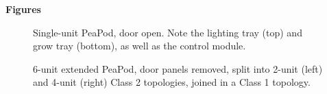 \clearpage

\textbf{Figures}

\begin{figure}[h!]
    \centering
    \caption{Single-unit PeaPod, door open. Note the lighting tray (top) and grow tray (bottom), as well as the control module.}
    \label{fig:housing_single}
\end{figure}

\begin{figure}[h!]
    \centering
    \caption{6-unit extended PeaPod, door panels removed, split into 2-unit (left) and 4-unit (right) Class 2 topologies, joined in a Class 1 topology.}
    \label{fig:housing_extended}
\end{figure}